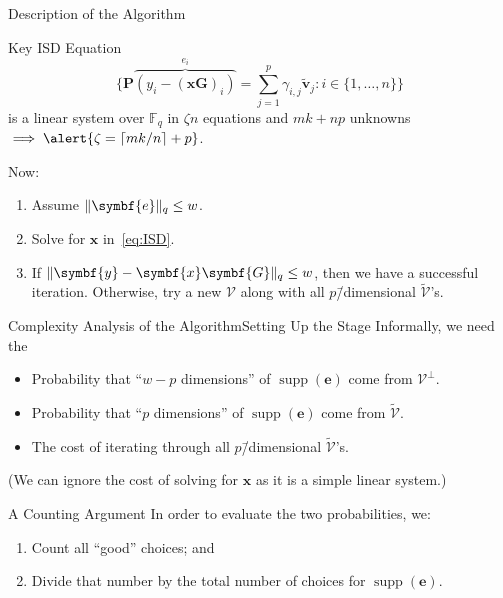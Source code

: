 \documentclass[usepdftitle=false]{beamer}
\renewcommand*{\vec}{\symbf}
\newcommand*{\mat}{\symbf}
\DeclareMathOperator{\supp}{supp}
\newcommand*{\FF}{\ensuremath{\mathbb{F}}}
\DeclarePairedDelimiter{\ceil}{\lceil}{\rceil}
\DeclarePairedDelimiter{\norm}{\lVert}{\rVert}
\newcommand*{\normR}[2]{\ensuremath{\norm{#1}_{#2}}}
\begin{document}
\begin{frame}{Description of the Algorithm}
  \begin{alertblock}{Key ISD Equation}
    \begin{equation}\label{eq:ISD}
      \{\mat{P} \overbrace{(y_i - {(\vec{x} \mat{G})}_i)}^{e_i} = \sum_{j
        = 1}^p \gamma_{i, j} \tilde{\vec{v}}_j : i \in \{1, \ldots,
      n\}\}
    \end{equation}
    is a linear system over \(\FF_q\) in \(\zeta n\) equations and
    \(m k + n p\) unknowns
    \(\implies \alert{\zeta = \ceil{m k / {n}} + p}\).
  \end{alertblock}
  Now:
  \begin{enumerate}
  \item Assume \(\normR{\vec{e}}{q} \le w\).
  \item Solve for \(\vec{x}\) in~\eqref{eq:ISD}.
  \item If \(\normR{\vec{y} - \vec{x} \mat{G}}{q} \le w\), then we
    have a successful iteration.  Otherwise, try a new \(\mathcal{V}\)
    along with all \(p\)\=/dimensional \(\tilde{\mathcal{V}}\)'s.
  \end{enumerate}
\end{frame}

\begin{frame}{Complexity Analysis of the Algorithm}{Setting Up the Stage}
  Informally, we need the
  \begin{itemize}
  \item Probability that \enquote{\(w - p\) dimensions} of
    \(\supp(\vec{e})\) come from \(\mathcal{V}^{\perp}\).
  \item Probability that \enquote{\(p\) dimensions} of
    \(\supp(\vec{e})\) come from \(\tilde{\mathcal{V}}\).
  \item The cost of iterating through all \(p\)\=/dimensional
    \(\tilde{\mathcal{V}}\)'s.
  \end{itemize}
  (We can ignore the cost of solving for \(\vec{x}\) as it is a simple
  linear system.)
  \begin{alertblock}{A Counting Argument}
    In order to evaluate the two probabilities, we:
    \begin{enumerate}
    \item Count all \enquote{good} choices; and
    \item Divide that number by the total number of choices for
      \(\supp(\vec{e})\).
    \end{enumerate}
  \end{alertblock}
\end{frame}
\end{document}

